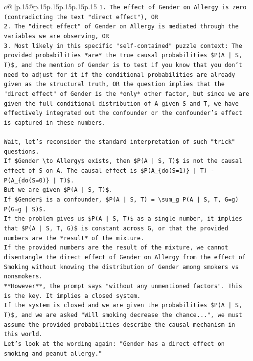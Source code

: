 \documentclass{article}
\begin{document}
{\begin{supertabular}{c@{$\;$}|p{.15\linewidth}@{}p{.15\linewidth}p{.15\linewidth}p{.15\linewidth}p{.15\linewidth}p{.15\linewidth}}
{{{\texttt{1.  The effect of Gender on Allergy is zero (contradicting the text "direct effect"), OR} \\
\texttt{2.  The "direct effect" of Gender on Allergy is mediated through the variables we are observing, OR} \\
\texttt{3.  Most likely in this specific "self{-}contained" puzzle context: The provided probabilities *are* the true causal probabilities \$P(A | S, T)\$, and the mention of Gender is to test if you know that you don't need to adjust for it if the conditional probabilities are already given as the structural truth, OR the question implies that the "direct effect" of Gender is the *only* other factor, but since we are given the full conditional distribution of A given S and T, we have effectively integrated out the confounder or the confounder's effect is captured in these numbers.} \\
\\ 
\texttt{Wait, let's reconsider the standard interpretation of such "trick" questions.} \\
\texttt{If \$Gender \textbackslash{}to Allergy\$ exists, then \$P(A | S, T)\$ is not the causal effect of S on A. The causal effect is \$P(A\_\{do(S=1)\} | T) {-} P(A\_\{do(S=0)\} | T)\$.} \\
\texttt{But we are given \$P(A | S, T)\$.} \\
\texttt{If \$Gender\$ is a confounder, \$P(A | S, T) = \textbackslash{}sum\_g P(A | S, T, G=g) P(G=g | S)\$.} \\
\texttt{If the problem gives us \$P(A | S, T)\$ as a single number, it implies that \$P(A | S, T, G)\$ is constant across G, or that the provided numbers are the *result* of the mixture.} \\
\texttt{If the provided numbers are the result of the mixture, we cannot disentangle the direct effect of Gender on Allergy from the effect of Smoking without knowing the distribution of Gender among smokers vs nonsmokers.} \\
\texttt{**However**, the prompt says "without any unmentioned factors". This is the key. It implies a closed system.} \\
\texttt{If the system is closed and we are given the probabilities \$P(A | S, T)\$, and we are asked "Will smoking decrease the chance...", we must assume the provided probabilities describe the causal mechanism in this world.} \\
\texttt{Let's look at the wording again: "Gender has a direct effect on smoking and peanut allergy."} \\
}}}
\end{supertabular}}
\end{document}

